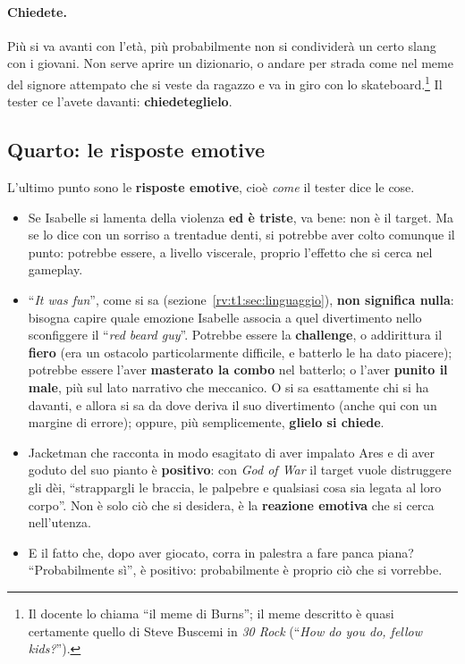 \paragraph{Chiedete.} Più si va avanti con l'età, più probabilmente non si
condividerà un certo slang con i giovani. Non serve aprire un dizionario, o
andare per strada come nel meme del signore attempato che si veste da
ragazzo e va in giro con lo skateboard.\footnote{Il docente lo chiama ``il
meme di Burns''; il meme descritto è quasi certamente quello di Steve
Buscemi in \emph{30 Rock} (``\emph{How do you do, fellow kids?}'').} Il
tester ce l'avete davanti: \textbf{chiedeteglielo}.

\subsection{Quarto: le risposte emotive}

L'ultimo punto sono le \textbf{risposte emotive}, cioè \emph{come} il tester
dice le cose.
\begin{itemize}
  \item Se Isabelle si lamenta della violenza \textbf{ed è triste}, va bene:
        non è il target. Ma se lo dice con un sorriso a trentadue denti,
        si potrebbe aver colto comunque il punto: potrebbe essere, a livello
        viscerale, proprio l'effetto che si cerca nel gameplay.
  \item ``\emph{It was fun}'', come si sa
        (sezione~\ref{rv:t1:sec:linguaggio}), \textbf{non significa
        nulla}: bisogna capire quale emozione Isabelle associa a quel
        divertimento nello sconfiggere il ``\emph{red beard guy}''. Potrebbe
        essere la \textbf{challenge}, o addirittura il \textbf{fiero} (era
        un ostacolo particolarmente difficile, e batterlo le ha dato
        piacere); potrebbe essere l'aver \textbf{masterato la combo} nel
        batterlo; o l'aver \textbf{punito il male}, più sul lato narrativo
        che meccanico. O si sa esattamente chi si ha davanti, e allora si sa
        da dove deriva il suo divertimento (anche qui con un margine di
        errore); oppure, più semplicemente, \textbf{glielo si chiede}.
  \item Jacketman che racconta in modo esagitato di aver impalato Ares e di
        aver goduto del suo pianto è \textbf{positivo}: con \emph{God of War}
        il target vuole distruggere gli dèi, ``strappargli le braccia, le
        palpebre e qualsiasi cosa sia legata al loro corpo''. Non è solo ciò
        che si desidera, è la \textbf{reazione emotiva} che si cerca
        nell'utenza.
  \item E il fatto che, dopo aver giocato, corra in palestra a fare panca
        piana? ``Probabilmente sì'', è positivo: probabilmente è proprio ciò
        che si vorrebbe.
\end{itemize}


